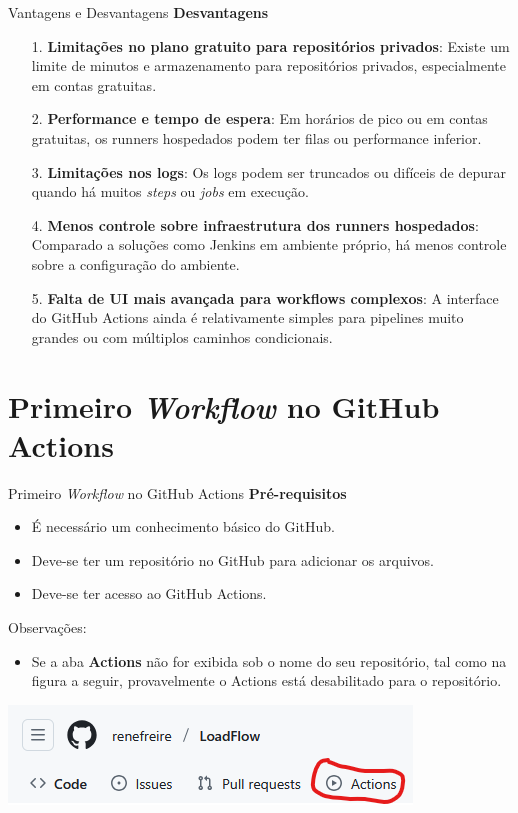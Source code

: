 \documentclass[t,serif]{beamer}
\begin{document}
	\begin{frame}{Vantagens e Desvantagens}
		\textbf{Desvantagens}
		\begin{enumerate}
			\item[1.] \textbf{Limitações no plano gratuito para repositórios privados}: Existe um limite de minutos e armazenamento para repositórios privados, especialmente em contas gratuitas.
			\item[2.] \textbf{Performance e tempo de espera}: Em horários de pico ou em contas gratuitas, os runners hospedados podem ter filas ou performance inferior.
			\item[3.] \textbf{Limitações nos logs}: Os logs podem ser truncados ou difíceis de depurar quando há muitos \textit{steps} ou \textit{jobs} em execução.
			\item[4.] \textbf{Menos controle sobre infraestrutura dos runners hospedados}: Comparado a soluções como Jenkins em ambiente próprio, há menos controle sobre a configuração do ambiente.
			\item[5.] \textbf{Falta de UI mais avançada para workflows complexos}: A interface do GitHub Actions ainda é relativamente simples para pipelines muito grandes ou com múltiplos caminhos condicionais.
		\end{enumerate}
	\end{frame}
	
\section{Primeiro \textit{Workflow} no GitHub Actions}
	\begin{frame}{Primeiro \textit{Workflow} no GitHub Actions}
		\textbf{Pré-requisitos}
		\begin{itemize}
			\item É necessário um conhecimento básico do GitHub.
			\item Deve-se ter um repositório no GitHub para adicionar os arquivos.
			\item Deve-se ter acesso ao GitHub Actions.
		\end{itemize}
		\begin{block}{Observações:}
			\begin{itemize}
				\item Se a aba \textbf{Actions} não for exibida sob o nome do seu repositório, tal como na figura a seguir, provavelmente o Actions está desabilitado para o repositório.
			\end{itemize}
			\begin{center}
				\includegraphics[width=0.9\linewidth]{figs/3_3.png}
			\end{center}
		\end{block}
	\end{frame}
	
\end{document}
